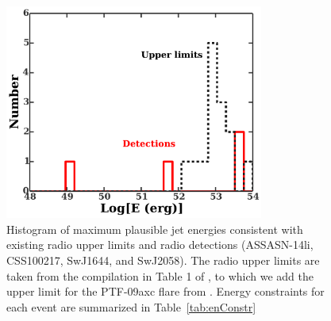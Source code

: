 \documentclass[usenatbib,fleqn]{mnras}
\begin{document}
\begin{figure}
\includegraphics[width=8.5cm]{hist.pdf}
\caption{\label{fig:hist} Histogram of maximum plausible jet energies
  consistent with existing radio upper limits and radio detections
  (ASSASN-14li, CSS100217, SwJ1644, and SwJ2058). The radio upper
  limits are taken from the compilation in Table 1 of
  \citet{Mimica+2015}, to which we add the upper limit for the
  PTF-09axc flare from \citet{Arcavi+2014}. Energy constraints for
  each event are summarized in Table~\ref{tab:enConstr}}
\end{figure}
\end{document}
